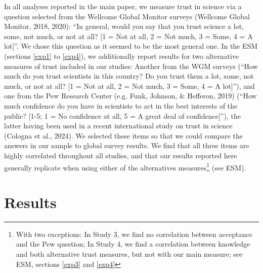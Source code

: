 \documentclass[
  doc,floatsintext]{apa6}
\begin{document}
In all analyses reported in the main paper, we measure trust in science via a question selected from the Wellcome Global Monitor surveys (Wellcome Global Monitor, 2018, 2020): ``In general, would you say that you trust science a lot, some, not much, or not at all? {[}1 = Not at all, 2 = Not much, 3 = Some, 4 = A lot{]}''. We chose this question as it seemed to be the most general one. In the ESM (sections \ref{exp1} to \ref{exp4}), we additionally report results for two alternative measures of trust included in our studies: Another from the WGM surveys (``How much do you trust scientists in this country? Do you trust them a lot, some, not much, or not at all? {[}1 = Not at all, 2 = Not much, 3 = Some, 4 = A lot{]}''), and one from the Pew Research Center (e.g. Funk, Johnson, \& Hefferon, 2019) (``How much confidence do you have in scientists to act in the best interests of the public? {[}1-5; 1 = No confidence at all, 5 = A great deal of confidence{]}''), the latter having been used in a recent international study on trust in science (Cologna et al., 2024). We selected these items so that we could compare the answers in our sample to global survey results. We find that all three items are highly correlated throughout all studies, and that our results reported here generally replicate when using either of the alternatives measures\footnote{With two exceptions: In Study 3, we find no correlation between acceptance and the Pew question; In Study 4, we find a correlation between knowledge and both alternative trust measures, but not with our main measure; see ESM, sections \ref{exp3} and \ref{exp4}} (see ESM).

\section{Results}\label{results}
\end{document}
